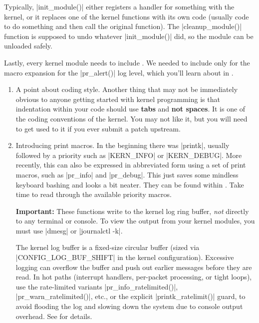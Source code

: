 \documentclass[10pt, oneside]{book}
\begin{document}
Typically, \cpp|init_module()| either registers a handler for something with the kernel, 
or it replaces one of the kernel functions with its own code (usually code to do something and then call the original function).
The \cpp|cleanup_module()| function is supposed to undo whatever \cpp|init_module()| did, so the module can be unloaded safely.

Lastly, every kernel module needs to include .
We needed to include  only for the macro expansion for the \cpp|pr_alert()| log level, which you'll learn about in .

\begin{enumerate}
  \item A point about coding style.
        Another thing that may not be immediately obvious to anyone getting started with kernel programming is that indentation within your code should use \textbf{tabs} and \textbf{not spaces}.
        It is one of the coding conventions of the kernel.
        You may not like it, but you will need to get used to it if you ever submit a patch upstream.

  \item Introducing print macros.
  \label{sec:printk}
        In the beginning there was \cpp|printk|, usually followed by a priority such as \cpp|KERN_INFO| or \cpp|KERN_DEBUG|.
        More recently, this can also be expressed in abbreviated form using a set of print macros, such as \cpp|pr_info| and \cpp|pr_debug|.
        This just saves some mindless keyboard bashing and looks a bit neater.
        They can be found within .
        Take time to read through the available priority macros.

        \textbf{Important:} These functions write to the kernel log ring buffer, \emph{not} directly to any terminal or console.
        To view the output from your kernel modules, you must use \sh|dmesg| or \sh|journalctl -k|.

        The kernel log buffer is a fixed-size circular buffer (sized via \cpp|CONFIG_LOG_BUF_SHIFT| in the kernel configuration).
        Excessive logging can overflow the buffer and push out earlier messages before they are read.
        In hot paths (interrupt handlers, per-packet processing, or tight loops), use the rate-limited variants \cpp|pr_info_ratelimited()|, \cpp|pr_warn_ratelimited()|, etc., or the explicit \cpp|printk_ratelimit()| guard, to avoid flooding the log and slowing down the system due to console output overhead.
        See  for details.


\end{enumerate}
\end{document}
